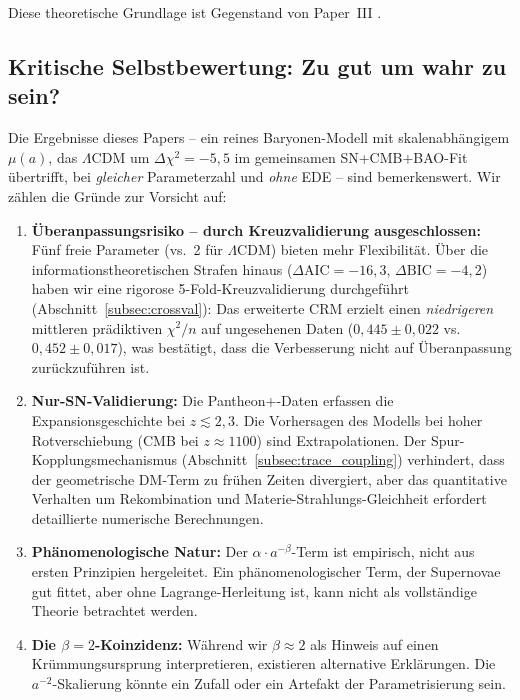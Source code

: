 \documentclass[aps,prd,twocolumn,superscriptaddress,nofootinbib]{revtex4-2}
\begin{document}
Diese theoretische Grundlage ist Gegenstand von Paper~III \cite{Geiger2026c}.

\subsection{Kritische Selbstbewertung: Zu gut um wahr zu sein?}

Die Ergebnisse dieses Papers -- ein reines Baryonen-Modell mit skalenabh\"angigem $\mu(a)$, das $\Lambda$CDM um $\Delta\chi^2 = -5{,}5$ im gemeinsamen SN+CMB+BAO-Fit \"ubertrifft, bei \textit{gleicher} Parameterzahl und \textit{ohne} EDE -- sind bemerkenswert. Wir z\"ahlen die Gr\"unde zur Vorsicht auf:

\begin{enumerate}
\item \textbf{\"Uberanpassungsrisiko -- durch Kreuzvalidierung ausgeschlossen:} F\"unf freie Parameter (vs.\ 2 f\"ur $\Lambda$CDM) bieten mehr Flexibilit\"at. \"Uber die informationstheoretischen Strafen hinaus ($\Delta\mathrm{AIC} = -16{,}3$, $\Delta\mathrm{BIC} = -4{,}2$) haben wir eine rigorose 5-Fold-Kreuzvalidierung durchgef\"uhrt (Abschnitt~\ref{subsec:crossval}): Das erweiterte CRM erzielt einen \textit{niedrigeren} mittleren pr\"adiktiven $\chi^2/n$ auf ungesehenen Daten ($0{,}445 \pm 0{,}022$ vs.\ $0{,}452 \pm 0{,}017$), was best\"atigt, dass die Verbesserung nicht auf \"Uberanpassung zur\"uckzuf\"uhren ist.

\item \textbf{Nur-SN-Validierung:} Die Pantheon+-Daten erfassen die Expansionsgeschichte bei $z \lesssim 2{,}3$. Die Vorhersagen des Modells bei hoher Rotverschiebung (CMB bei $z \approx 1100$) sind Extrapolationen. Der Spur-Kopplungsmechanismus (Abschnitt~\ref{subsec:trace_coupling}) verhindert, dass der geometrische DM-Term zu fr\"uhen Zeiten divergiert, aber das quantitative Verhalten um Rekombination und Materie-Strahlungs-Gleichheit erfordert detaillierte numerische Berechnungen.

\item \textbf{Ph\"anomenologische Natur:} Der $\alpha \cdot a^{-\beta}$-Term ist empirisch, nicht aus ersten Prinzipien hergeleitet. Ein ph\"anomenologischer Term, der Supernovae gut fittet, aber ohne Lagrange-Herleitung ist, kann nicht als vollst\"andige Theorie betrachtet werden.

\item \textbf{Die $\beta = 2$-Koinzidenz:} W\"ahrend wir $\beta \approx 2$ als Hinweis auf einen Kr\"ummungsursprung interpretieren, existieren alternative Erkl\"arungen. Die $a^{-2}$-Skalierung k\"onnte ein Zufall oder ein Artefakt der Parametrisierung sein.


\end{enumerate}
\end{document}
